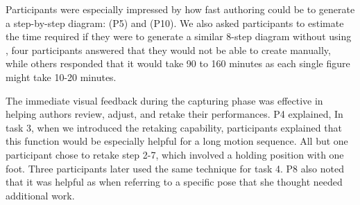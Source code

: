 Participants were especially impressed by how fast authoring could be to generate a step-by-step diagram:
 (P5) and
 (P10).
%
We also asked participants to estimate the time required if they were to generate a similar 8-step diagram without using \systemname{}, four participants answered that they would not be able to create manually, while others responded that it would take 90 to 160 minutes as each single figure might take 10-20 minutes.
%

The immediate visual feedback during the capturing phase was effective in helping authors review, adjust, and retake their performances.
P4 explained, 
In task 3, when we introduced the retaking capability, participants explained that this function would be especially helpful for a long motion sequence. All but one participant chose to retake step 2-7, which involved a holding position with one foot. %
Three participants later used the same technique for task 4. P8 also noted that it was helpful as  when referring to a specific pose that she thought needed additional work.


